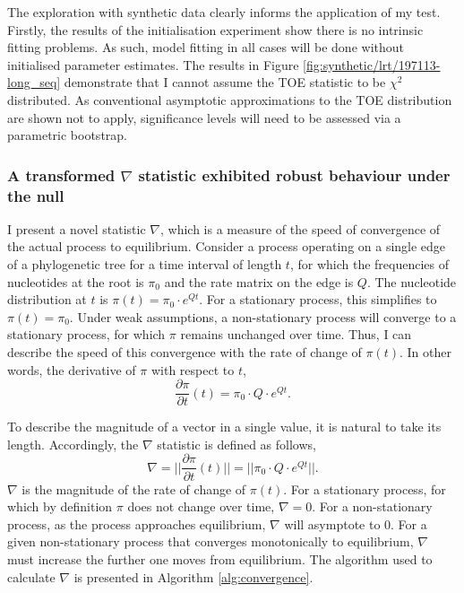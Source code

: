 

The exploration with synthetic data clearly informs the application of my test. Firstly, the results of the initialisation experiment show there is no intrinsic fitting problems. As such, model fitting in all cases will be done without initialised parameter estimates. The results in Figure \ref{fig:synthetic/lrt/197113-long_seq} demonstrate that I cannot assume the TOE statistic to be $\chi^{2}$ distributed. As conventional asymptotic approximations to the TOE distribution are shown not to apply, significance levels will need to be assessed via a parametric bootstrap. 

\subsubsection*{A transformed $\nabla$ statistic exhibited robust behaviour under the null}

I present a novel statistic $\nabla$, which is a measure of the speed of convergence of the actual process to equilibrium. Consider a process operating on a single edge of a phylogenetic tree for a time interval of length $t$, for which the frequencies of nucleotides at the root is $\pi_0$ and the rate matrix on the edge is $Q$. The nucleotide distribution at $t$ is $\pi(t) = \pi_{0} \cdot e^{Qt}$. For a stationary process, this simplifies to $\pi(t) = \pi_{0}$. Under weak assumptions, a non-stationary process will converge to a stationary process, for which $\pi$ remains unchanged over time. Thus, I can describe the speed of this convergence with the rate of change of $\pi(t)$. In other words, the derivative of $\pi$ with respect to $t$,
\begin{equation}
\label{eq:dpi/dt}
\frac{\partial \pi}{\partial t}(t) = \pi_{0} \cdot Q \cdot e^{Qt}.
\end{equation}

To describe the magnitude of a vector in a single value, it is natural to take its length. Accordingly, the $\nabla$ statistic is defined as follows,
\begin{equation}
\label{eq:len-dpi/dt}
\nabla = ||\frac{\partial \pi}{\partial t}(t)|| =|| \pi_{0} \cdot Q \cdot e^{Qt}||.
\end{equation}
$\nabla$ is the magnitude of the rate of change of $\pi(t)$. For a stationary process, for which by definition $\pi$ does not change over time, $\nabla = 0$. For a non-stationary process, as the process approaches equilibrium, $\nabla$ will asymptote to $0$. For a given non-stationary process that converges monotonically to equilibrium, $\nabla$ must increase the further one moves from equilibrium. The algorithm used to calculate $\nabla$ is presented in Algorithm \ref{alg:convergence}.

